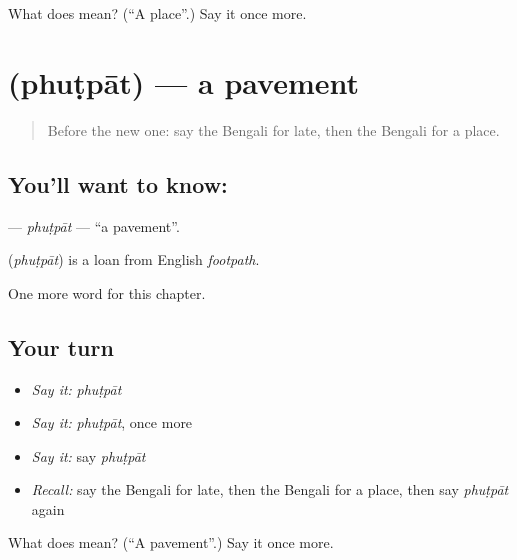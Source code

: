 \begin{tcolorbox}[breakable,colback=teal!4,colframe=teal!35!black,title={Before you move on}]
What does  mean? (\textquotedblleft{}A place\textquotedblright{}.) Say it once more.
\end{tcolorbox}
\section[\texorpdfstring{\bn{ফুটপাত} (phuṭpāt)}{ফুটপাত (phuṭpāt)}]{ (phuṭpāt) — a pavement}

\label{lesson:BN-C157-phutpat}



\begin{quote}
Before the new one: say the Bengali for late, then the Bengali for a place.
\end{quote}

\subsection*{You'll want to know: }
\textbf{} — \emph{phuṭpāt} — \textquotedblleft{}a pavement\textquotedblright{}.

\begin{cousinweb}
\textbf{} (\emph{phuṭpāt}) is a loan from English \emph{footpath}.
\end{cousinweb}

\begin{grammarlens}[title={What you've built}]
One more word for this chapter.
\end{grammarlens}

\subsection*{Your turn}
\begin{itemize}
\raggedright
  \item \emph{Say it:} \emph{phuṭpāt}
  \item \emph{Say it:} \emph{phuṭpāt}, once more
  \item \emph{Say it:} say \emph{phuṭpāt}
  \item \emph{Recall:} say the Bengali for late, then the Bengali for a place, then say \emph{phuṭpāt} again
\end{itemize}

\begin{tcolorbox}[breakable,colback=teal!4,colframe=teal!35!black,title={Before you move on}]
What does  mean? (\textquotedblleft{}A pavement\textquotedblright{}.) Say it once more.
\end{tcolorbox}
